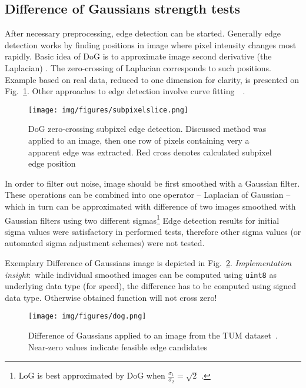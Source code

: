 \subsection{Difference of Gaussians strength tests}
\label{sec:dog_tests}

After necessary preprocessing, edge detection can be started. Generally edge detection works by finding positions in image where pixel intensity changes most rapidly. Basic idea of DoG is to approximate image second derivative (the Laplacian) \cite{szeliski} \cite{jain1995machine}. The zero-crossing of Laplacian corresponds to such positions. Example based on real data, reduced to one dimension for clarity, is presented on Fig.~\ref{fig:slice}. Other approaches to edge detection involve curve fitting~\cite{fabijanska}~\cite{devernay1995non}.

\begin{figure}[ht]
	\centering\texttt{[image: img/figures/subpixelslice.png]}
	\caption{ DoG zero-crossing subpixel edge detection. Discussed method was applied to an image, then one row of pixels containing very a apparent edge was extracted. Red cross denotes calculated subpixel edge position }
	\label{fig:slice}
\end{figure}

In order to filter out noise, image should be first smoothed with a Gaussian filter. These operations can be combined into one operator -- Laplacian of Gaussian -- which in turn can be approximated with difference of two images smoothed with Gaussian filters using two different sigmas\footnote{LoG is best approximated by DoG when $\frac{\sigma_{1}}{\sigma_{2}} = \sqrt{2}$ \cite{sift}.} Edge detection results for initial sigma values were satisfactory in performed tests, therefore other sigma values (or automated sigma adjustment schemes) were not tested.

Exemplary Difference of Gaussians image is depicted in Fig.~\ref{fig:dog}. \textit{Implementation insight}:~while individual smoothed images can be computed using {\tt uint8} as underlying data type (for speed), the difference has to be computed using signed data type. Otherwise obtained function will not cross zero!

\newpage

\begin{figure}[ht]
	\centering\texttt{[image: img/figures/dog.png]}
	\caption{ Difference of Gaussians applied to an image from the TUM dataset~\cite{tum}. Near-zero values indicate feasible edge candidates }
	\label{fig:dog}
\end{figure}

